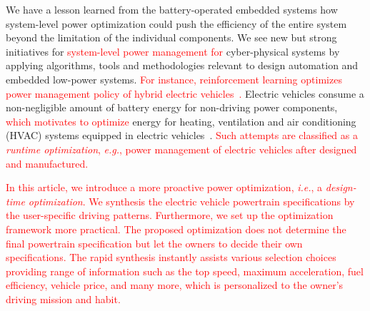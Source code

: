 \documentclass[journal]{IEEEtran}
\begin{document}
We have a lesson learned from the battery-operated embedded systems how system-level power optimization could push the efficiency of the entire system beyond the limitation of the individual components. We see new but strong initiatives for \textcolor{red}{system-level power management for} cyber-physical systems by applying algorithms, tools and methodologies relevant to design automation and embedded low-power systems.
\textcolor{red}{For instance, reinforcement learning optimizes power management policy of hybrid electric vehicles~\cite{Lin:ICCAD14}.}
Electric vehicles consume a non-negligible amount of battery energy for non-driving power components, \textcolor{red}{which motivates to  optimize} energy for heating, ventilation and air conditioning (HVAC) systems equipped in electric vehicles~\cite{Vatanparvar:DAC15}.
\textcolor{red}{Such attempts are classified as a \textit{runtime optimization}, \textit{e.g.}, power management of electric vehicles after designed and manufactured.}

\textcolor{red}{In this article, we introduce a more proactive power optimization, \textit{i.e.}, a \textit{design-time optimization}. We synthesis the electric vehicle powertrain specifications by the user-specific driving patterns. Furthermore, we set up the optimization framework more practical. The proposed optimization does not determine the final powertrain specification but let the owners to decide their own specifications. The rapid synthesis instantly assists various selection choices providing range of information such as the top speed, maximum acceleration, fuel efficiency, vehicle price, and many more, which is personalized to the owner's driving mission and habit.}

\end{document}
